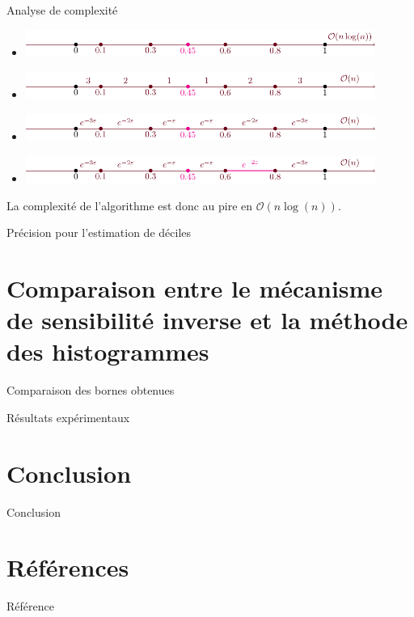 \documentclass[10pt,serif]{beamer}
\begin{document}
  \begin{frame}{Analyse de complexité}
    \begin{center}
      \begin{itemize}
        \item<1->{\includegraphics[width=0.90\textwidth, clip]{"./presentation/figures/step1.pdf"}}\vspace{0.8cm}
        \item<2->{\includegraphics[width=0.90\textwidth, clip]{"./presentation/figures/step2.pdf"}}\vspace{0.8cm}
        \item<3->{\includegraphics[width=0.90\textwidth, clip]{"./presentation/figures/step3.pdf"}}\vspace{0.8cm}
        \item<4->{\includegraphics[width=0.90\textwidth, clip]{"./presentation/figures/step4.pdf"}}\vspace{0.8cm}
      \end{itemize}
    \end{center}

    La complexité de l'algorithme est donc au pire en \(\mathcal O(n\log(n))\).
  \end{frame}

  \begin{frame}{Précision pour l'estimation de déciles}

  \end{frame}

\section{Comparaison entre le mécanisme de sensibilité inverse et la méthode des histogrammes}
  \begin{frame}{Comparaison des bornes obtenues}

  \end{frame}

  \begin{frame}{Résultats expérimentaux}

  \end{frame}

\section{Conclusion}
  \begin{frame}{Conclusion}

  \end{frame}

\section{Références}

  \begin{frame}{Référence}
    \printbibliography
  \end{frame}
\end{document}
